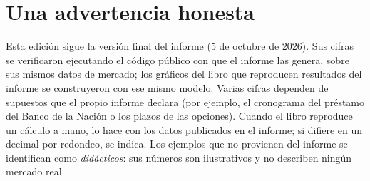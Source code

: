 \section*{Una advertencia honesta}

Esta edición sigue la versión final del informe (5 de octubre de 2026). Sus cifras se verificaron ejecutando el código público con que el informe las genera, sobre sus mismos datos de mercado; los gráficos del libro que reproducen resultados del informe se construyeron con ese mismo modelo. Varias cifras dependen de supuestos que el propio informe declara (por ejemplo, el cronograma del préstamo del Banco de la Nación o los plazos de las opciones). Cuando el libro reproduce un cálculo a mano, lo hace con los datos publicados en el informe; si difiere en un decimal por redondeo, se indica. Los ejemplos que no provienen del informe se identifican como \emph{didácticos}: sus números son ilustrativos y no describen ningún mercado real.
